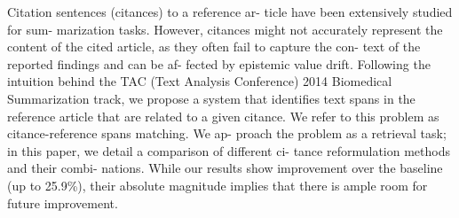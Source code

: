 Citation sentences (citances) to a reference ar- ticle have been extensively studied for sum- marization tasks. However, citances might not accurately represent the content of the cited article, as they often fail to capture the con- text of the reported findings and can be af- fected by epistemic value drift. Following the intuition behind the TAC (Text Analysis Conference) 2014 Biomedical Summarization track, we propose a system that identifies text spans in the reference article that are related to a given citance. We refer to this problem as citance-reference spans matching. We ap- proach the problem as a retrieval task; in this paper, we detail a comparison of different ci- tance reformulation methods and their combi- nations. While our results show improvement over the baseline (up to 25.9\%), their absolute magnitude implies that there is ample room for future improvement.
